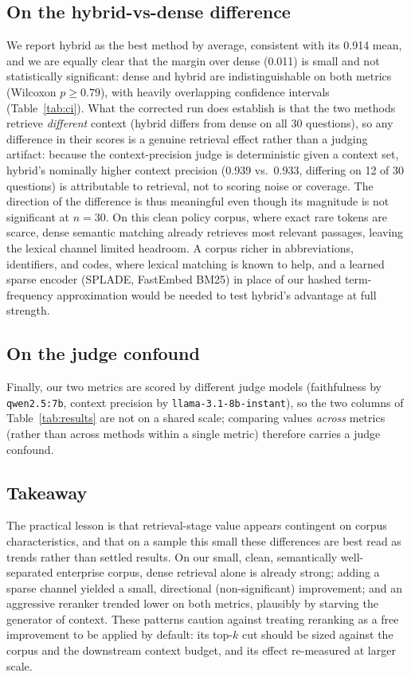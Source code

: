\documentclass[conference]{IEEEtran}
\begin{document}
\subsection{On the hybrid-vs-dense difference}
We report hybrid as the best method by average, consistent with its 0.914 mean,
and we are equally clear that the margin over dense (0.011) is small and not
statistically significant: dense and hybrid are indistinguishable on both metrics
(Wilcoxon $p\geq0.79$), with heavily overlapping confidence intervals
(Table~\ref{tab:ci}). What the corrected run does establish is that the two
methods retrieve \emph{different} context (hybrid differs from dense on all 30
questions), so any difference in their scores is a genuine retrieval effect rather
than a judging artifact: because the context-precision judge is deterministic
given a context set, hybrid's nominally higher context precision (0.939 vs.\
0.933, differing on 12 of 30 questions) is attributable to retrieval, not to
scoring noise or coverage. The direction of the difference is thus meaningful even
though its magnitude is not significant at $n=30$. On this clean policy corpus,
where exact rare tokens are scarce, dense semantic matching already retrieves most
relevant passages, leaving the lexical channel limited headroom. A corpus richer
in abbreviations, identifiers, and codes, where lexical
matching is known to help, and a learned sparse encoder (SPLADE, FastEmbed BM25)
in place of our hashed term-frequency approximation would be needed to test
hybrid's advantage at full strength.

\subsection{On the judge confound}
Finally, our two metrics are scored by different judge models (faithfulness by
\texttt{qwen2.5:7b}, context precision by \texttt{llama-3.1-8b-instant}), so the
two columns of Table~\ref{tab:results} are not on a shared scale; comparing values
\emph{across} metrics (rather than across methods within a single metric)
therefore carries a judge confound.

\subsection{Takeaway}
The practical lesson is that retrieval-stage value appears contingent on corpus
characteristics, and that on a sample this small these differences are best read
as trends rather than settled results. On our small, clean, semantically
well-separated enterprise corpus, dense retrieval alone is already strong; adding
a sparse channel yielded a small, directional (non-significant) improvement; and
an aggressive reranker trended lower on both metrics, plausibly by starving the
generator of context. These patterns caution against treating reranking as a free
improvement to be applied by default: its top-$k$ cut should be sized against the
corpus and the downstream context budget, and its effect re-measured at larger
scale.
\end{document}
